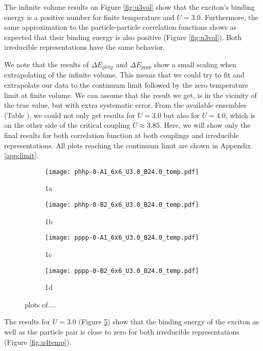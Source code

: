 The infinite volume results on Figure \ref{fig:u3vol} show that the exciton's binding energy is a positive number for finite temperature and $U=3.0$. Furthermore, the same approximation to the particle-particle correlation functions shows as expected that their binding energy is also positive (Figure \ref{fig:u3vol}). Both irreducible representations have the same behavior.

We note that the results of $\Delta E_{phhp}$ and $\Delta E_{pppp}$ show a small scaling when extrapolating of the infinite volume. This means that we could try to fit and extrapolate our data to the continuum limit followed by the zero temperature limit at finite volume. We can assume that the result we get, is in the vicinity of the true value, but with extra systematic error. From the available ensembles (Table ), we could not only get results for $U=3.0$ but also for $U=4.0$, which is on the other side of the critical coupling $U\approx 3.85$. Here, we will show only the final results for both correlation function at both couplings and irreducible representations. All plots reaching the continuum limit are shown in Appendix \ref{app:limit}. 
\begin{figure}
    \begin{subfigure}{.5\textwidth}
      \centering
      \texttt{[image: phhp-0-A1\_6x6\_U3.0\_B24.0\_temp.pdf]}
      \caption{1a}
      \label{fig:sfig1}
    \end{subfigure}%
    \begin{subfigure}{.5\textwidth}
      \centering
      \texttt{[image: phhp-0-B2\_6x6\_U3.0\_B24.0\_temp.pdf]}
      \caption{1b}
      \label{fig:sfig2}
    \end{subfigure}
    \begin{subfigure}{.5\textwidth}
        \centering
        \texttt{[image: pppp-0-A1\_6x6\_U3.0\_B24.0\_temp.pdf]}
        \caption{1c}
        \label{fig:sfig3}
    \end{subfigure}
    \begin{subfigure}{.5\textwidth}
        \centering
        \texttt{[image: pppp-0-B2\_6x6\_U3.0\_B24.0\_temp.pdf]}
        \caption{1d}
        \label{fig:sfig4}
    \end{subfigure}
    \caption{plots of....}
    \label{fig:u3temp}
  \end{figure}
The results for $U=3.0$ (Figure \ref{fig:u3temp}) show that the binding energy of the exciton as well as the particle pair is close to zero for both irreducible representations (Figure \ref{fig:u4temp}). 
